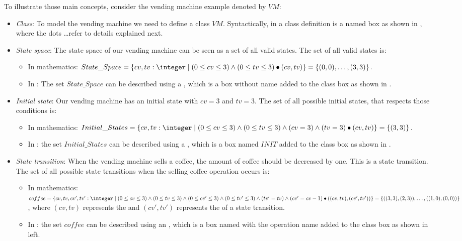 To illustrate those main concepts, consider the vending machine example denoted by $VM$:
\begin{itemize}
\item \textit{Class}: To model the vending machine we need to define a class $VM$. Syntactically, in \oz{}
a class definition is a named box as shown in , where the dots \dots refer to details explained next.


\item \textit{State space}: The state space of our vending machine can be seen as a set of all valid states. The set of all valid states is:
\begin{itemize}
\item In mathematics: $State\_Space=\{cv,tv: \integer\mid (0 \leq  cv \leq 3) \wedge
(0 \leq  tv \leq 3)\bullet(cv,tv)\}  =\{\pair{0}{0},\dots,\pair{3}{3}\}$.
\item In \oz{}: The set $State\_Space$ can be described using a , which is a box without name added to the class box as shown in .
\end{itemize}


\item \textit{Initial state}: Our vending machine has an initial state with $cv = 3$ and $tv = 3$. The set of all possible initial states, that respects those conditions is:  
\begin{itemize}
\item In mathematics: $Initial\_States =\{cv,tv: \integer\mid (0 \leq  cv \leq 3) \wedge
(0 \leq  tv \leq 3)\wedge (cv = 3) \wedge (tv = 3)\bullet(cv,tv)\}  =\{\pair{3}{3}\}$.
\item In \oz{}: the set $Initial\_States$ can be described using a , which is a box named $INIT$ added to the class box  as shown in .
\end{itemize}


\item \textit{State transition}: When the vending machine sells a coffee, the amount of coffee should be decreased by one. This is a state transition.
The set of all possible state transitions when the selling coffee operation occurs is:
\begin{itemize}
\item In mathematics: $coffee =\{cv,tv,cv',tv': \integer\mid (0 \leq  cv \leq 3) \wedge
(0 \leq  tv \leq 3)\wedge (0 \leq  cv' \leq 3) \wedge (0 \leq  tv' \leq 3)\wedge (tv' = tv) \wedge (cv' = cv - 1) \bullet\pair{\pair{cv}{tv}}{\pair{cv'}{tv'}}\}  =\{\pair{\pair{3}{3}}{\pair{2}{3}},\dots,\pair{\pair{1}{0}}{\pair{0}{0}}\}$, where $(cv,tv)$ represents the  and $(cv',tv')$ represents the  of a state transition.
\item In \oz{}: the set $coffee$ can be described using an , which is a box named with the operation name added to the class box as shown in  left.
\end{itemize}


\end{itemize}
